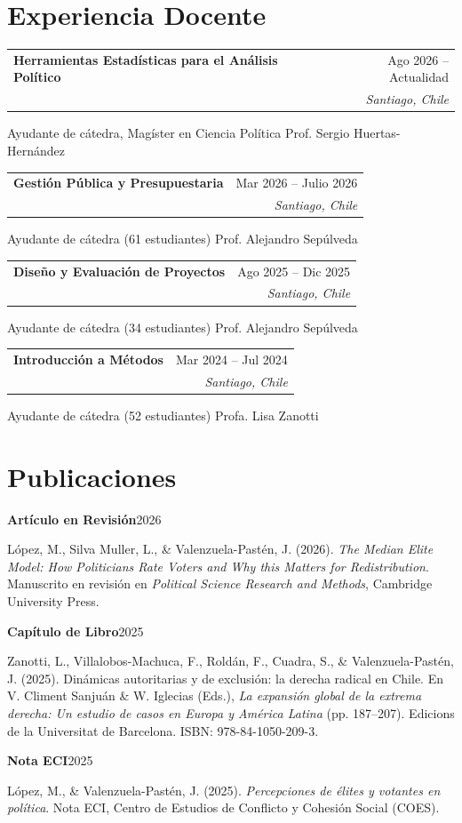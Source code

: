 \documentclass[a4paper,10pt]{article}
\makeatletter
\newcommand{\experience}[5]{%
    \par\noindent\begin{minipage}{\linewidth}%
        \renewcommand{\arraystretch}{0.92}%
        \begin{tabularx}{\linewidth}{@{}>{\raggedright\arraybackslash}X@{\hspace{1em}}r@{}}%
            \textbf{#1} & {#2}\\
            {\itshape #3} & {\itshape #4}%
        \end{tabularx}\par
        #5%
    \end{minipage}\par\addvspace{2pt}%
}
\newcommand{\cvpublication}[3]{%
    \par\noindent\begin{minipage}{\linewidth}%
        \textbf{#1}\hfill{#2}\par
        #3%
    \end{minipage}\par\addvspace{2pt}%
}
\makeatother
\begin{document}
\section*{Experiencia Docente}

\experience{Herramientas Estadísticas para el Análisis Político}{Ago 2026 -- Actualidad}{Instituto de Ciencia Política, Pontificia Universidad Católica de Chile}{Santiago, Chile}{
    Ayudante de cátedra, Magíster en Ciencia Política \enspace\textperiodcentered\enspace Prof. Sergio Huertas-Hernández
}

\experience{Gestión Pública y Presupuestaria}{Mar 2026 -- Julio 2026}{Escuela de Ciencia Política, UDP}{Santiago, Chile}{
    Ayudante de cátedra (61 estudiantes) \enspace\textperiodcentered\enspace Prof. Alejandro Sepúlveda
}

\experience{Diseño y Evaluación de Proyectos}{Ago 2025 -- Dic 2025}{Escuela de Ciencia Política, UDP}{Santiago, Chile}{
    Ayudante de cátedra (34 estudiantes) \enspace\textperiodcentered\enspace Prof. Alejandro Sepúlveda
}

\experience{Introducción a Métodos}{Mar 2024 -- Jul 2024}{Escuela de Ciencia Política, UDP}{Santiago, Chile}{
    Ayudante de cátedra (52 estudiantes) \enspace\textperiodcentered\enspace Profa. Lisa Zanotti
}

\section*{Publicaciones}

\cvpublication{Artículo en Revisión}{2026}{
    López, M., Silva Muller, L., \& Valenzuela-Pastén, J. (2026). \textit{The Median Elite Model: How Politicians Rate Voters and Why this Matters for Redistribution}. Manuscrito en revisión en \textit{Political Science Research and Methods}, Cambridge University Press.
}

\cvpublication{Capítulo de Libro}{2025}{
    Zanotti, L., Villalobos-Machuca, F., Roldán, F., Cuadra, S., \& Valenzuela-Pastén, J. (2025). Dinámicas autoritarias y de exclusión: la derecha radical en Chile. En V. Climent Sanjuán \& W. Iglecias (Eds.), \textit{La expansión global de la extrema derecha: Un estudio de casos en Europa y América Latina} (pp. 187--207). Edicions de la Universitat de Barcelona. ISBN: 978-84-1050-209-3.
}

\cvpublication{Nota ECI}{2025}{
    López, M., \& Valenzuela-Pastén, J. (2025). \textit{Percepciones de élites y votantes en política}. Nota ECI, Centro de Estudios de Conflicto y Cohesión Social (COES).
}
\end{document}
